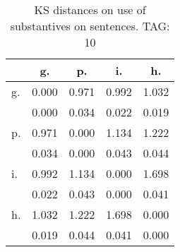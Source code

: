 \begin{table}[h!]
\begin{center}
\begin{tabular}{| l | c | c | c | c |}\hline
 & g. & p. & i. & h. \\\hline
g. & 0.000  & 0.971  & 0.992  & 1.032 \\\hline
 & 0.000  & 0.034  & 0.022  & 0.019 \\\hline
p. & 0.971  & 0.000  & 1.134  & 1.222 \\\hline
 & 0.034  & 0.000  & 0.043  & 0.044 \\\hline
i. & 0.992  & 1.134  & 0.000  & 1.698 \\\hline
 & 0.022  & 0.043  & 0.000  & 0.041 \\\hline
h. & 1.032  & 1.222  & 1.698  & 0.000 \\\hline
 & 0.019  & 0.044  & 0.041  & 0.000 \\\hline
\end{tabular}
\caption{KS distances on use of substantives on sentences. TAG: 10}
\end{center}
\end{table}